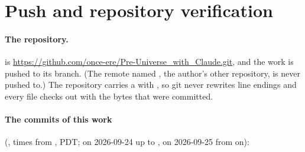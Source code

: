 \section{Push and repository verification}
\label{sec:12}

\paragraph{The repository.}  is \url{https://github.com/once-ere/Pre-Universe_with_Claude.git},
and the work is pushed to its  branch. (The remote named , the author's other
repository, is never pushed to.) The repository carries a  with , so git
never rewrites line endings and every file checks out with the bytes that were committed.

\paragraph{The commits of this work} (, times from , PDT;
on 2026-09-24 up to , on 2026-09-25 from  on):

